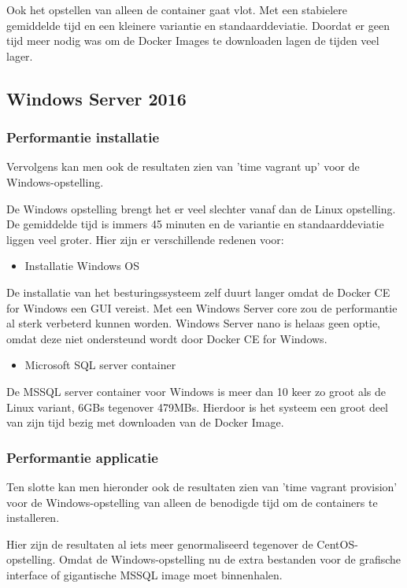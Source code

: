 Ook het opstellen van alleen de container gaat vlot. Met een stabielere gemiddelde tijd en een kleinere variantie en standaarddeviatie. Doordat er geen tijd meer nodig was om de Docker Images te downloaden lagen de tijden veel lager.

\subsection{Windows Server 2016}
\subsubsection{Performantie installatie}
Vervolgens kan men ook de resultaten zien van 'time vagrant up' voor de Windows-opstelling.






De Windows opstelling brengt het er veel slechter vanaf dan de Linux opstelling. De gemiddelde tijd is immers 45 minuten en de variantie en standaarddeviatie liggen veel groter. Hier zijn er verschillende redenen voor:

\begin{itemize}[noitemsep]
	\item Installatie Windows OS
\end{itemize}

De installatie van het besturingssysteem zelf duurt langer omdat de Docker CE for Windows een GUI vereist. Met een Windows Server core zou de performantie al sterk verbeterd kunnen worden. Windows Server nano is helaas geen optie, omdat deze niet ondersteund wordt door Docker CE for Windows.

\begin{itemize}[noitemsep]
	\item Microsoft SQL server container
\end{itemize}

De MSSQL server container voor Windows is meer dan 10 keer zo groot als de Linux variant,  6GBs tegenover 479MBs. Hierdoor is het systeem een groot deel van zijn tijd bezig met downloaden van de Docker Image.

\subsubsection{Performantie applicatie}
Ten slotte kan men hieronder ook de resultaten zien van 'time vagrant provision' voor de Windows-opstelling van alleen de benodigde tijd om de containers te installeren.






Hier zijn de resultaten al iets meer genormaliseerd tegenover de CentOS-opstelling. Omdat de Windows-opstelling nu de extra bestanden voor de grafische interface of gigantische MSSQL image moet binnenhalen.